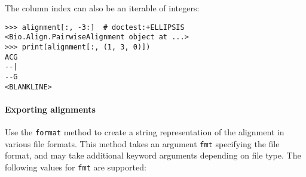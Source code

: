 The column index can also be an iterable of integers:
\begin{verbatim}
>>> alignment[:, -3:]  # doctest:+ELLIPSIS
<Bio.Align.PairwiseAlignment object at ...>
>>> print(alignment[:, (1, 3, 0)])
ACG
--|
--G
<BLANKLINE>
\end{verbatim}

\paragraph*{Exporting alignments}

Use the \verb+format+ method to create a string representation of the alignment in various file formats. This method takes an argument \verb+fmt+ specifying the file format, and may take additional keyword arguments depending on file type. The following values for \verb+fmt+ are supported:

